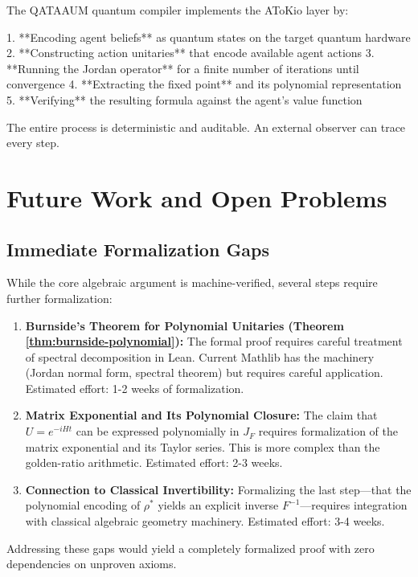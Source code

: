 \documentclass[11pt,a4paper]{article}
\theoremstyle{plain}
\theoremstyle{definition}
\begin{document}
The QATAAUM quantum compiler implements the AToKio layer by:

1. **Encoding agent beliefs** as quantum states on the target quantum hardware
2. **Constructing action unitaries** that encode available agent actions
3. **Running the Jordan operator** for a finite number of iterations until convergence
4. **Extracting the fixed point** and its polynomial representation
5. **Verifying** the resulting formula against the agent's value function

The entire process is deterministic and auditable. An external observer can trace every step.

\section{Future Work and Open Problems}
\label{sec:future}

\subsection{Immediate Formalization Gaps}

While the core algebraic argument is machine-verified, several steps require further formalization:

\begin{enumerate}
\item \textbf{Burnside's Theorem for Polynomial Unitaries (Theorem \ref{thm:burnside-polynomial}):}
  The formal proof requires careful treatment of spectral decomposition in Lean. Current Mathlib has the machinery (Jordan normal form, spectral theorem) but requires careful application. Estimated effort: 1-2 weeks of formalization.

\item \textbf{Matrix Exponential and Its Polynomial Closure:}
  The claim that $U = e^{-iHt}$ can be expressed polynomially in $J_F$ requires formalization of the matrix exponential and its Taylor series. This is more complex than the golden-ratio arithmetic. Estimated effort: 2-3 weeks.

\item \textbf{Connection to Classical Invertibility:}
  Formalizing the last step—that the polynomial encoding of $\rho^*$ yields an explicit inverse $F^{-1}$—requires integration with classical algebraic geometry machinery. Estimated effort: 3-4 weeks.
\end{enumerate}

Addressing these gaps would yield a completely formalized proof with zero dependencies on unproven axioms.
\end{document}
